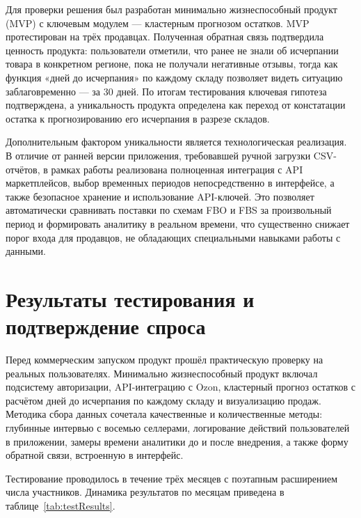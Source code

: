 Для проверки решения был разработан минимально жизнеспособный продукт (MVP) с ключевым модулем --- кластерным прогнозом остатков. MVP протестирован на трёх продавцах. Полученная обратная связь подтвердила ценность продукта: пользователи отметили, что ранее не знали об исчерпании товара в конкретном регионе, пока не получали негативные отзывы, тогда как функция «дней до исчерпания» по каждому складу позволяет видеть ситуацию заблаговременно --- за 30 дней. По итогам тестирования ключевая гипотеза подтверждена, а уникальность продукта определена как переход от констатации остатка к прогнозированию его исчерпания в разрезе складов.

Дополнительным фактором уникальности является технологическая реализация. В отличие от ранней версии приложения, требовавшей ручной загрузки CSV-отчётов, в рамках работы реализована полноценная интеграция с API маркетплейсов, выбор временных периодов непосредственно в интерфейсе, а также безопасное хранение и использование API-ключей. Это позволяет автоматически сравнивать поставки по схемам FBO и FBS за произвольный период и формировать аналитику в реальном времени, что существенно снижает порог входа для продавцов, не обладающих специальными навыками работы с данными.

\section{Результаты тестирования и подтверждение спроса}

Перед коммерческим запуском продукт прошёл практическую проверку на реальных пользователях. Минимально жизнеспособный продукт включал подсистему авторизации, API-интеграцию с Ozon, кластерный прогноз остатков с расчётом дней до исчерпания по каждому складу и визуализацию продаж. Методика сбора данных сочетала качественные и количественные методы: глубинные интервью с восемью селлерами, логирование действий пользователей в приложении, замеры времени аналитики до и после внедрения, а также форму обратной связи, встроенную в интерфейс.

Тестирование проводилось в течение трёх месяцев с поэтапным расширением числа участников. Динамика результатов по месяцам приведена в таблице~\ref{tab:testResults}.

